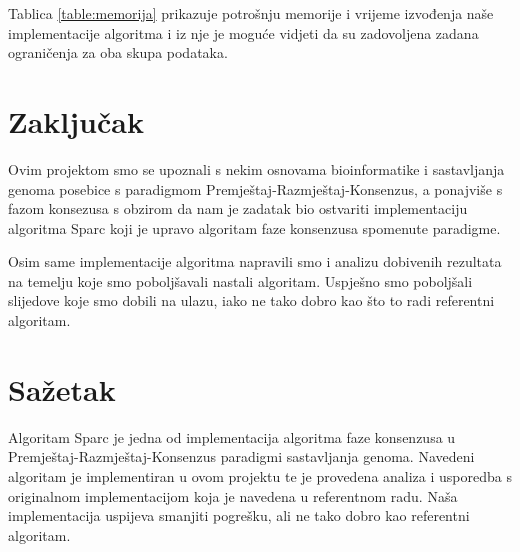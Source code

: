\documentclass[times, utf8, seminar, numeric]{fer}
\begin{document}
Tablica \ref{table:memorija} prikazuje potrošnju memorije i vrijeme izvođenja naše implementacije algoritma i iz nje je moguće vidjeti da su zadovoljena zadana ograničenja za oba skupa podataka. 


\chapter{Zaključak}
Ovim projektom smo se upoznali s nekim osnovama bioinformatike i sastavljanja genoma posebice s paradigmom Premještaj-Razmještaj-Konsenzus, a ponajviše s fazom konsezusa s obzirom da nam je zadatak bio ostvariti implementaciju algoritma Sparc koji je upravo algoritam faze konsenzusa spomenute paradigme. 

Osim same implementacije algoritma napravili smo i analizu dobivenih rezultata na temelju koje smo poboljšavali nastali algoritam. Uspješno smo poboljšali slijedove koje smo dobili na ulazu, iako ne tako dobro kao što to radi referentni algoritam. 




\chapter{Sažetak}
Algoritam Sparc je jedna od implementacija algoritma faze konsenzusa u Premještaj-Razmještaj-Konsenzus paradigmi sastavljanja genoma. Navedeni algoritam je implementiran u ovom projektu te je provedena analiza i usporedba s originalnom implementacijom koja je navedena u referentnom radu. Naša implementacija uspijeva smanjiti pogrešku, ali ne tako dobro kao referentni algoritam.
\end{document}
